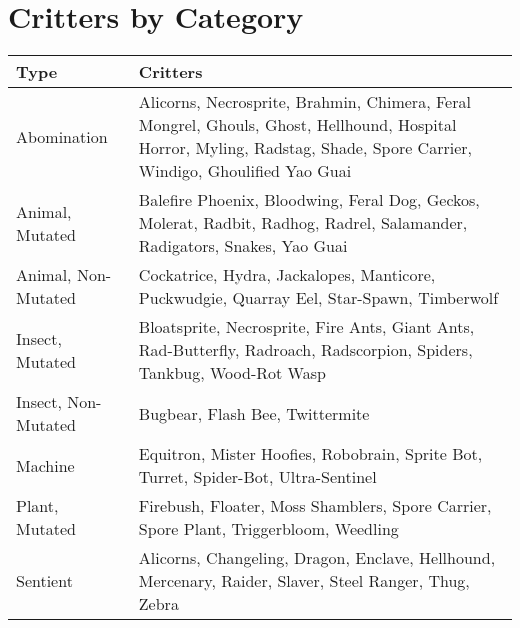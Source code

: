 \documentclass[11pt,a4paper,twocolumn]{book}
\begin{document}
	\chapter*{Critters by Category}
	{
		\begin{tabu} to 160mm{| X[l,1] | X[l,4] |}
			\hline
			 Type &  Critters                                                                                                                                           \\ \hline
			Abomination              & Alicorns, Necrosprite, Brahmin, Chimera, Feral Mongrel, Ghouls, Ghost, Hellhound, Hospital Horror, Myling, Radstag, Shade, Spore Carrier, Windigo, Ghoulified Yao Guai \\
			Animal, Mutated          & Balefire Phoenix, Bloodwing, Feral Dog, Geckos, Molerat, Radbit, Radhog, Radrel, Salamander,  Radigators, Snakes, Yao Guai                                             \\
			Animal, Non-Mutated      & Cockatrice, Hydra, Jackalopes, Manticore, Puckwudgie, Quarray Eel, Star-Spawn, Timberwolf                                                                                          \\
			Insect, Mutated          & Bloatsprite, Necrosprite, Fire Ants, Giant Ants, Rad-Butterfly, Radroach, Radscorpion, Spiders, Tankbug, Wood-Rot Wasp                                                 \\
			Insect, Non-Mutated      & Bugbear, Flash Bee, Twittermite                                                                                                                                                            \\
			Machine                  & Equitron, Mister Hoofies, Robobrain, Sprite Bot, Turret,   Spider-Bot, Ultra-Sentinel                                                                                  \\
			Plant, Mutated           & Firebush, Floater, Moss Shamblers, Spore Carrier,  Spore Plant, Triggerbloom, Weedling                                                                                 \\
			Sentient                 & Alicorns, Changeling, Dragon, Enclave, Hellhound, Mercenary, Raider, Slaver, Steel Ranger, Thug, Zebra                                                                 \\ \hline
		\end{tabu}
		
	}
	
\end{document}
